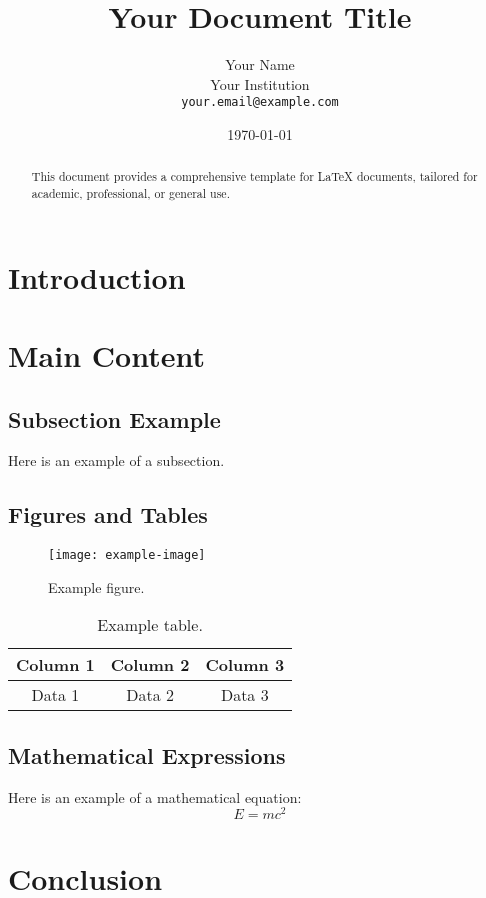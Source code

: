 \documentclass{article}
\title{\textbf{Your Document Title}}
\author{Your Name \\
        Your Institution \\
        \texttt{your.email@example.com}}
\date{\today} %
\begin{document}
\maketitle
\tableofcontents
\newpage

\begin{abstract}
This document provides a comprehensive template for LaTeX documents, tailored for academic, professional, or general use.
\end{abstract}

\section{Introduction}
\lipsum[1-2] %

\section{Main Content}
\subsection{Subsection Example}
Here is an example of a subsection.
\lipsum[3-4]

\subsection{Figures and Tables}
\begin{figure}[H]
    \centering
    \texttt{[image: example-image]}
    \caption{Example figure.}
    \label{fig:example}
\end{figure}

\begin{table}[H]
    \centering
    \begin{tabular}{|c|c|c|}
        \hline
        Column 1 & Column 2 & Column 3 \\
        \hline
        Data 1 & Data 2 & Data 3 \\
        \hline
    \end{tabular}
    \caption{Example table.}
    \label{tab:example}
\end{table}

\subsection{Mathematical Expressions}
Here is an example of a mathematical equation:
\begin{equation}
    E = mc^2
\end{equation}

\section{Conclusion}
\lipsum[5-6]

\newpage
\printbibliography
\end{document}
